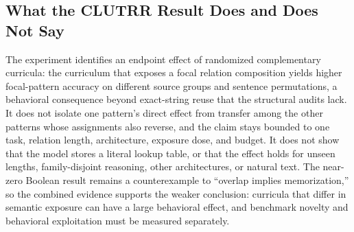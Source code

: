 \subsection{What the CLUTRR Result Does and Does Not Say}

The experiment identifies an endpoint effect of randomized complementary
curricula: the curriculum that exposes a focal relation composition yields
higher focal-pattern accuracy on different source groups and sentence
permutations, a behavioral consequence beyond exact-string reuse that the
structural audits lack.  It does not isolate one pattern's direct effect from
transfer among the other patterns whose assignments also reverse, and the
claim stays bounded to one task, relation length, architecture, exposure
dose, and budget.  It does not show that the model stores a literal lookup
table, or that the effect holds for unseen lengths, family-disjoint
reasoning, other architectures, or natural text.  The near-zero Boolean
result remains a counterexample to ``overlap implies memorization,'' so the
combined evidence supports the weaker conclusion: curricula that differ in
semantic exposure can have a large behavioral effect, and benchmark novelty
and behavioral exploitation must be measured separately.
